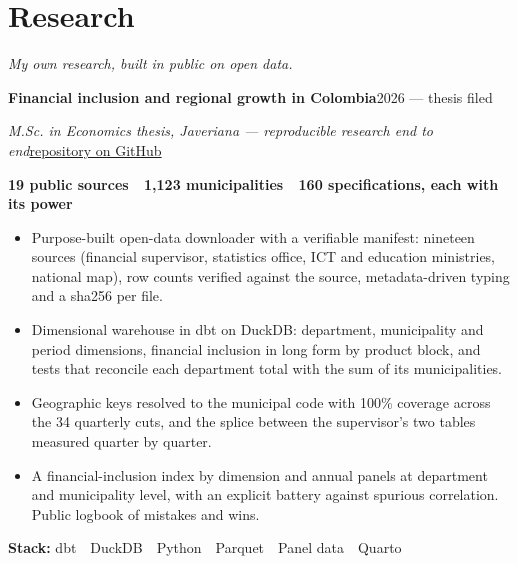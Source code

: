 \documentclass[a4paper,10pt]{article}
\newcommand{\headline}[2]{\needspace{3\baselineskip}\textbf{\color{ink}#1}\hfill{\small #2}\par}
\newcommand{\subline}[2]{\textit{#1}\hfill{\small #2}\par}
\begin{document}
\section*{Research}
{\small\itshape My own research, built in public on open data.}\par\vspace{3pt}
\headline{Financial inclusion and regional growth in Colombia}{2026 --- thesis filed}
\subline{M.Sc. in Economics thesis, Javeriana --- reproducible research end to end}{\href{https://github.com/DavinsonR/financial-inclusion-colombia}{repository on GitHub}}
{\small\bfseries\color{cold} 19 public sources \,\textperiodcentered\, 1,123 municipalities \,\textperiodcentered\, 160 specifications, each with its power}\par
\begin{itemize}[leftmargin=1.1em, itemsep=0pt, topsep=1pt, parsep=0pt]
  \item Purpose-built open-data downloader with a verifiable manifest: nineteen sources (financial supervisor, statistics office, ICT and education ministries, national map), row counts verified against the source, metadata-driven typing and a sha256 per file.
  \item Dimensional warehouse in dbt on DuckDB: department, municipality and period dimensions, financial inclusion in long form by product block, and tests that reconcile each department total with the sum of its municipalities.
  \item Geographic keys resolved to the municipal code with 100\% coverage across the 34 quarterly cuts, and the splice between the supervisor's two tables measured quarter by quarter.
  \item A financial-inclusion index by dimension and annual panels at department and municipality level, with an explicit battery against spurious correlation. Public logbook of mistakes and wins.
\end{itemize}
{\small\textbf{Stack:} dbt \,\textperiodcentered\, DuckDB \,\textperiodcentered\, Python \,\textperiodcentered\, Parquet \,\textperiodcentered\, Panel data \,\textperiodcentered\, Quarto}\par
\vspace{4pt}
\end{document}

